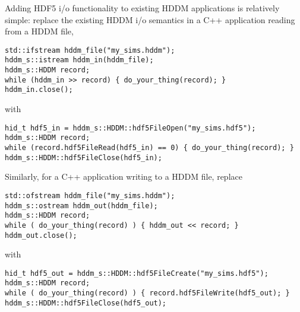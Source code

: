 \documentclass{revtex4}
\begin{document}
Adding HDF5 i/o functionality to existing HDDM applications is relatively 
simple: replace the existing HDDM i/o semantics in a C++ application reading
from a HDDM file,

\vspace{0.5cm}
\begin{minipage}{12cm}
\begin{verbatim}
std::ifstream hddm_file("my_sims.hddm");
hddm_s::istream hddm_in(hddm_file);
hddm_s::HDDM record;
while (hddm_in >> record) { do_your_thing(record); }
hddm_in.close();
\end{verbatim}
\end{minipage}
\vspace{0.5cm}

with

\vspace{0.5cm}
\begin{minipage}{12cm}
\begin{verbatim}
hid_t hdf5_in = hddm_s::HDDM::hdf5FileOpen("my_sims.hdf5");
hddm_s::HDDM record;
while (record.hdf5FileRead(hdf5_in) == 0) { do_your_thing(record); }
hddm_s::HDDM::hdf5FileClose(hdf5_in);
\end{verbatim}
\end{minipage}
\vspace{0.5cm}

Similarly, for a C++ application writing to a HDDM file, replace

\vspace{0.5cm}
\begin{minipage}{12cm}
\begin{verbatim}
std::ofstream hddm_file("my_sims.hddm");
hddm_s::ostream hddm_out(hddm_file);
hddm_s::HDDM record;
while ( do_your_thing(record) ) { hddm_out << record; }
hddm_out.close();
\end{verbatim}
\end{minipage}
\vspace{0.5cm}

with

\vspace{0.5cm}
\begin{minipage}{12cm}
\begin{verbatim}
hid_t hdf5_out = hddm_s::HDDM::hdf5FileCreate("my_sims.hdf5");
hddm_s::HDDM record;
while ( do_your_thing(record) ) { record.hdf5FileWrite(hdf5_out); }
hddm_s::HDDM::hdf5FileClose(hdf5_out);
\end{verbatim}
\end{minipage}
\vspace{0.5cm}
\end{document}
